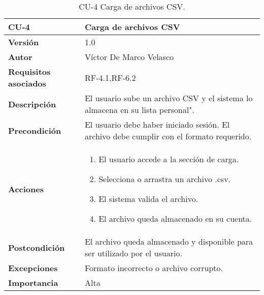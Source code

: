 \begin{table}[p]
	\centering
	\begin{tabularx}{\linewidth}{ p{} p{} }
		\toprule
		\textbf{CU-4}    & Carga de archivos CSV \\
		\toprule
		\textbf{Versión}              & 1.0 \\
		\textbf{Autor}                & Víctor De Marco Velasco \\
		\textbf{Requisitos asociados} & RF-4.1,RF-6.2 \\
		\textbf{Descripción}          & El usuario sube un archivo CSV y el sistema lo almacena en su lista personal". \\
		\textbf{Precondición}         & El usuario debe haber iniciado sesión. El archivo debe cumplir con el formato requerido. \\
		\textbf{Acciones}             &
		\begin{enumerate}
			\item El usuario accede a la sección de carga.
			\item Selecciona o arrastra un archivo .csv.
			\item El sistema valida el archivo.
			\item El archivo queda almacenado en su cuenta.
		\end{enumerate}\\
		\textbf{Postcondición}        & El archivo queda almacenado y disponible para ser utilizado por el usuario. \\
		\textbf{Excepciones}          & Formato incorrecto o archivo corrupto. \\
		\textbf{Importancia}          & Alta \\
		\bottomrule
	\end{tabularx}
	\caption{CU-4 Carga de archivos CSV.}
\end{table}

